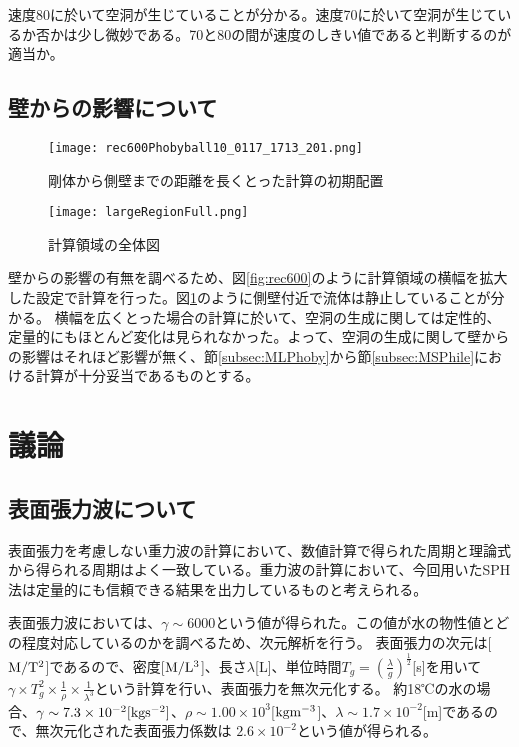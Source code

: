 \documentclass[]{jsarticle}
\begin{document}
速度80に於いて空洞が生じていることが分かる。速度70に於いて空洞が生じているか否かは少し微妙である。70と80の間が速度のしきい値であると判断するのが適当か。

\subsection{壁からの影響について}
\label{subsec:wall}
\begin{figure}[H]
  \centering
  \begin{minipage}{0.4\columnwidth}
    \centering
    \texttt{[image: rec600Phobyball10\_0117\_1713\_201.png]}
    \caption{剛体から側壁までの距離を長くとった計算の初期配置
      \label{fig:rec600} }
    \end{minipage}
    \begin{minipage}{0.5\columnwidth}
    \centering
    \texttt{[image: largeRegionFull.png]}
    \caption{計算領域の全体図\label{fig:largeRegionFull}}
  \end{minipage}
\end{figure}

壁からの影響の有無を調べるため、図\ref{fig:rec600}のように計算領域の横幅を拡大した設定で計算を行った。図\ref{fig:largeRegionFull}のように側壁付近で流体は静止していることが分かる。
横幅を広くとった場合の計算に於いて、空洞の生成に関しては定性的、定量的にもほとんど変化は見られなかった。よって、空洞の生成に関して壁からの影響はそれほど影響が無く、節\ref{subsec:MLPhoby}から節\ref{subsec:MSPhile}における計算が十分妥当であるものとする。

\newpage
\section{議論}
\subsection{表面張力波について}
\label{subsec:discSurfWave}
表面張力を考慮しない重力波の計算において、数値計算で得られた周期と理論式から得られる周期はよく一致している。重力波の計算において、今回用いたSPH法は定量的にも信頼できる結果を出力しているものと考えられる。

表面張力波においては、$\gamma\sim 6000$という値が得られた。この値が水の物性値とどの程度対応しているのかを調べるため、次元解析を行う。
表面張力の次元は[$\rm{M/T^2}$]であるので、密度[$\rm{M/L^3}$]、長さ$\lambda$[L]、単位時間$T_g=(\frac{\lambda}{g})^{\frac{1}{2}}$[s]を用いて$\gamma\times T_g^2 \times \frac{1}{\rho} \times \frac{1}{\lambda^3}$という計算を行い、表面張力を無次元化する。
約18℃の水の場合、$\gamma\sim 7.3\times 10^{-2}\rm{[kgs^{-2}]}$、$\rho\sim 1.00\times 10^3$[$\rm{kgm^{-3}}$]、$\lambda\sim 1.7\times10^{-2}$[m]であるので\cite{tatsumiKiso}、無次元化された表面張力係数は
$ 2.6\times10^{-2}$という値が得られる。
\end{document}
